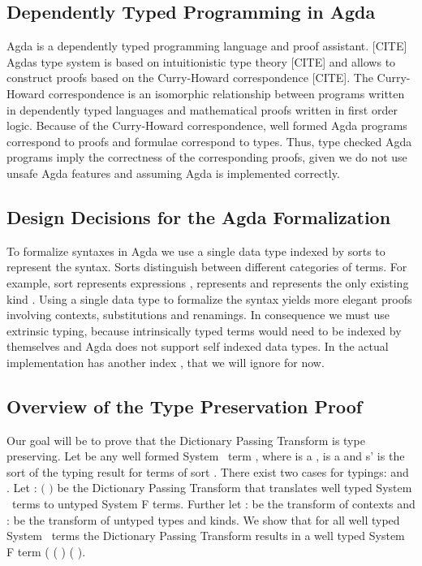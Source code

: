 \subsection{Dependently Typed Programming in Agda}
Agda is a dependently typed programming language and proof assistant. [CITE]
Agdas type system is based on intuitionistic type theory [CITE] and allows to construct proofs based on the Curry-Howard correspondence [CITE]. 
The Curry-Howard correspondence is an isomorphic relationship between programs written in dependently typed languages and mathematical proofs written in first order logic. 
Because of the Curry-Howard correspondence, well formed Agda programs correspond to proofs and formulae correspond to types. 
Thus, type checked Agda programs imply the correctness of the corresponding proofs, given we do not use unsafe Agda features and assuming Agda is implemented correctly. 

\subsection{Design Decisions for the Agda Formalization}
To formalize syntaxes in Agda we use a single data type  indexed by sorts  to represent the syntax. 
Sorts distinguish between different categories of terms. 
For example, sort  represents expressions ,  represents  and  represents the only existing kind . 
Using a single data type to formalize the syntax yields more elegant proofs involving contexts, substitutions and renamings. 
In consequence we must use extrinsic typing, because intrinsically typed terms      would need to be indexed by themselves and Agda does not support self indexed data types. 
In the actual implementation  has another index , that we will ignore for now.

\subsection{Overview of the Type Preservation Proof}
Our goal will be to prove that the Dictionary Passing Transform is type preserving. Let  be any well formed System \Fo\ term    \Constr{:} , where  is a  ,  is a   and s' is the sort of the typing result for terms of sort . There exist two cases for typings:    \Constr{:}  and    \Constr{:} . Let  : $($   \Constr{:} $)$    be the Dictionary Passing Transform that translates well typed System \Fo\ terms to untyped System F terms. Further let  :    be the transform of contexts and  :      be the transform of untyped types and kinds. We show that for all well typed System \Fo\  terms  the Dictionary Passing Transform results in a well typed System F term (   ( ) \Constr{:} ( ). 

